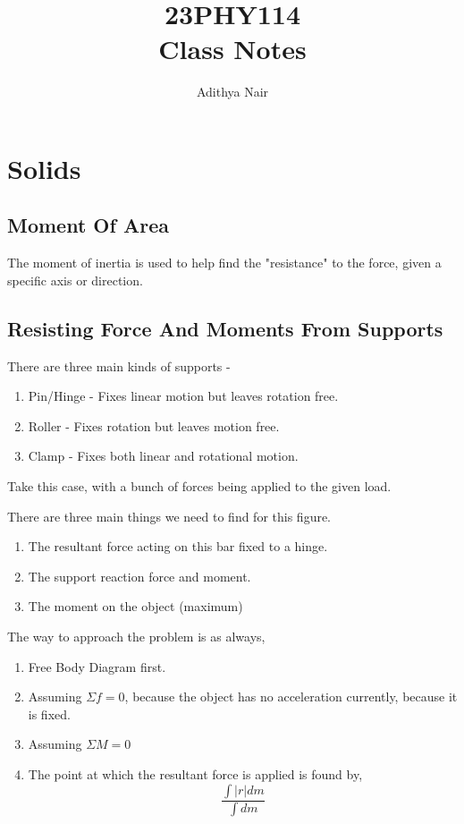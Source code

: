 \documentclass{report}
\title{\Huge{23PHY114}\\ Class Notes}
\author{\huge{Adithya Nair}}
\date{}
\begin{document}
\maketitle
\newpage%
\tableofcontents
\chapter{Solids}
\createintro
\section{Moment Of Area}
The moment of inertia is used to help find the "resistance" to the force, given a specific axis or direction.

\section{Resisting Force And Moments From Supports} %
\label{sec:resisting_force_and_moments_from_supports}
There are three main kinds of supports - 
\begin{enumerate}
  \item Pin/Hinge - Fixes linear motion but leaves rotation free. 
  \item Roller - Fixes rotation but leaves motion free. 
  \item Clamp - Fixes both linear and rotational motion.
\end{enumerate}
Take this case, with a bunch of forces being applied to the given load. 

There are three main things we need to find for this figure. 
\begin{enumerate}
  \item The resultant force acting on this bar fixed to a hinge. 
  \item The support reaction force and moment.
  \item The moment on the object (maximum)
\end{enumerate}
The way to approach the problem is as always,
\begin{enumerate}
  \item Free Body Diagram first. 
  \item Assuming $\Sigma f = 0 $, because the object has no acceleration currently, because it is fixed.
  \item Assuming $\Sigma M = 0$
  \item The point at which the resultant force is applied is found by, 
    \[
      \frac{\int |r|dm}{\int dm}
    \]
\end{enumerate}
\end{document}
